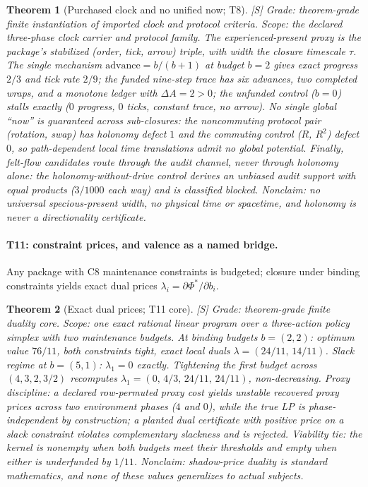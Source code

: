 \documentclass[11pt]{article}
\newcommand{\gradeS}{\textsf{[S]}}
\newtheorem{theorem}{Theorem}[section]
\theoremstyle{definition}
\begin{document}
\begin{theorem}[Purchased clock and no unified now; T8]
\gradeS{} \emph{Grade:} theorem-grade finite instantiation of imported clock
and protocol criteria. \emph{Scope:} the declared three-phase clock carrier
and protocol family. The experienced-present proxy is the package's
stabilized (order, tick, arrow) triple, with width the closure timescale
$\tau$. The single mechanism $\mathrm{advance} = b/(b+1)$ at budget $b=2$
gives exact progress $2/3$ and tick rate $2/9$; the funded nine-step trace
has six advances, two completed wraps, and a monotone ledger with
$\Delta A = 2 > 0$; the unfunded control ($b=0$) stalls exactly ($0$
progress, $0$ ticks, constant trace, no arrow). No single global ``now'' is
guaranteed across sub-closures: the noncommuting protocol pair (rotation,
swap) has holonomy defect $1$ and the commuting control ($R$, $R^2$) defect
$0$, so path-dependent local time translations admit no global potential.
Finally, felt-flow candidates route through the audit channel, never through
holonomy alone: the holonomy-without-drive control derives an unbiased audit
support with equal products ($3/1000$ each way) and is classified blocked.
\emph{Nonclaim:} no universal specious-present width, no physical time or
spacetime, and holonomy is never a directionality certificate.
\end{theorem}

\paragraph{T11: constraint prices, and valence as a named bridge.}
Any package with C8 maintenance constraints is budgeted; closure under
binding constraints yields exact dual prices $\lambda_i = \partial \Phi^* /
\partial b_i$.

\begin{theorem}[Exact dual prices; T11 core]
\gradeS{} \emph{Grade:} theorem-grade finite duality core. \emph{Scope:} one
exact rational linear program over a three-action policy simplex with two
maintenance budgets. At binding budgets $b=(2,2)$: optimum value $76/11$,
both constraints tight, exact local duals $\lambda = (24/11,\, 14/11)$. Slack
regime at $b=(5,1)$: $\lambda_1 = 0$ exactly. Tightening the first budget
across $(4,3,2,3/2)$ recomputes $\lambda_1 = (0,\, 4/3,\, 24/11,\, 24/11)$,
non-decreasing. Proxy discipline: a declared row-permuted proxy cost yields
unstable recovered proxy prices across two environment phases ($4$ and $0$),
while the true LP is phase-independent by construction; a planted dual
certificate with positive price on a slack constraint violates complementary
slackness and is rejected. Viability tie: the kernel is nonempty when both
budgets meet their thresholds and empty when either is underfunded by
$1/11$. \emph{Nonclaim:} shadow-price duality is standard mathematics, and
none of these values generalizes to actual subjects.
\end{theorem}
\end{document}
